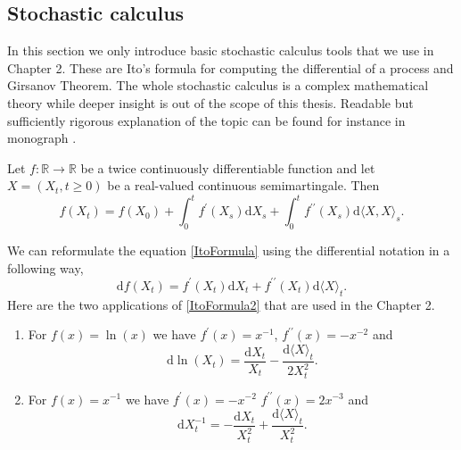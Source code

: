 \begin{appendices}
\chapter{Stochastic calculus}
In this section we only introduce basic stochastic calculus tools that we use in Chapter 2. These are Ito's formula for computing the differential of a process and Girsanov Theorem. The whole stochastic calculus is a complex mathematical theory while deeper insight is out of the scope of this thesis. Readable but sufficiently rigorous explanation of the topic can be found for instance in monograph \cite{Shreve}.\\
\begin{thm} 
\label{ItoThm}
Let $f:\mathbb{R}\rightarrow\mathbb{R}$ be a twice continuously differentiable function and let $X=(X_t,t\geq0)$ be a real-valued continuous semimartingale. Then
\begin{equation}
\label{ItoFormula}
f(X_t)=f(X_0)+\int_0^t f^{\prime}(X_s)\mathrm{d}X_s+\int_0^t f^{\prime\prime}(X_s)\mathrm{d}\langle X,X \rangle_s.
\end{equation}
\end{thm}
\noindent We can reformulate the equation \eqref{ItoFormula} using the differential notation in a following way,
\begin{equation}
\label{ItoFormula2}
\mathrm{d}f(X_t)=f^{\prime}(X_t)\mathrm{d}X_t+f^{\prime\prime}(X_t)\mathrm{d}\langle X\rangle_t.
\end{equation}
Here are the two applications of \eqref{ItoFormula2} that are used in the Chapter 2.
\begin{enumerate}
\item For $f(x)=\ln(x)$ we have $f^{\prime}(x)=x^{-1}$, $f^{\prime\prime}(x)=-x^{-2}$ and
\[\mathrm{d}\ln(X_t)=\frac{\mathrm{d}X_t}{X_t}-\frac{\mathrm{d}\langle X\rangle_t}{2X_t^2}.\]
\item For $f(x)=x^{-1}$ we have $f^{\prime}(x)=-x^{-2}$ $f^{\prime\prime}(x)=2 x^{-3}$ and
\[\mathrm{d}X_t^{-1}=-\frac{\mathrm{d}X_t}{X_t^2}+\frac{\mathrm{d}\langle X\rangle_t}{X_t^2}.\]
\end{enumerate}


\end{appendices}
